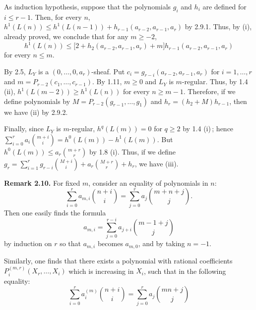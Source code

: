 As induction hypothesis, suppose that the polynomials \(g_i\) and \(h_i\) are defined for \(i\le r-1\). Then, for every \(n\), \(h^1(L(n))\le h^1(L(n-1))+h_{r-1}(a_{r-2},a_{r-1},a_r)\) by 2.9.1. Thus, by (i),
%
already proved, we conclude that for any \(m\ge -2\),
\[
h^1(L(n))\le
\bigl[2+h_2(a_{r-2},a_{r-1},a_r)+m\bigr]
h_{r-1}(a_{r-2},a_{r-1},a_r)
\tag{2.9.2}
\]
for every \(n\le m\).

By 2.5, \(L_Y\) is a \((0,\ldots,0,a_r)\)-sheaf. Put \(c_i=g_{r-i}(a_{r-2},a_{r-1},a_r)\) for \(i=1,\ldots,r\) and \(m=P_{r-2}(c_1,\ldots,c_{r-1})\). By 1.11, \(m\ge0\) and \(L_Y\) is \(m\)-regular. Thus, by 1.4 (ii), \(h^1(L(m-2))\ge h^1(L(n))\) for every \(n\ge m-1\). Therefore, if we define polynomials by \(M=P_{r-2}(g_{r-1},\ldots,g_1)\) and \(h_r=(h_2+M)h_{r-1}\), then we have (ii) by 2.9.2.

Finally, since \(L_Y\) is \(m\)-regular, \(h^q(L(m))=0\) for \(q\ge2\) by 1.4 (i)\,; hence \(\sum_{i=0}^{r}a_i\binom{m+i}{i}=h^0(L(m))-h^1(L(m))\). But \(h^0(L(m))\le a_r\binom{m+r}{r}\) by 1.8 (i). Thus, if we define \(g_r=\sum_{i=1}^{r}g_{r-i}\binom{M+i}{i}+a_r\binom{M+r}{r}+h_r\), we have (iii).

\textbf{Remark 2.10.} For fixed \(m\), consider an equality of polynomials in \(n\):
\[
\sum_{i=0}^{r}a_{m,i}\binom{n+i}{i}
=
\sum_{j=0}^{r}a_j\binom{m+n+j}{j}.
\]
Then one easily finds the formula
\[
a_{m,i}=\sum_{j=0}^{r-i}a_{j+i}\binom{m-1+j}{j}
\]
by induction on \(r\) so that \(a_{m,i}\) becomes \(a_{m,0}\), and by taking \(n=-1\).

Similarly, one finds that there exists a polynomial with rational coefficients \(P_i^{(m,r)}(X_r,\ldots,X_i)\) which is increasing in \(X_i\), such that in the following equality:
\[
\sum_{i=0}^{r}a_i^{(m)}\binom{n+i}{i}
=
\sum_{j=0}^{r}a_j\binom{mn+j}{j}
\]

